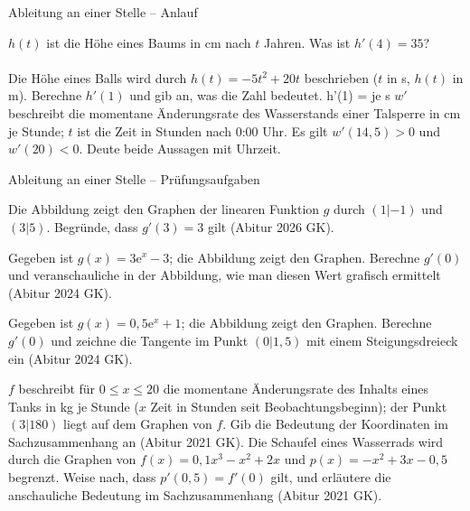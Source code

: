 \begin{aufgabe}{Ableitung an einer Stelle – Anlauf}
\begin{teile}
\teil $h(t)$ ist die Höhe eines Baums in cm nach $t$ Jahren. Was ist $h'(4) = 35$? \\  \\ 
\teil Die Höhe eines Balls wird durch $h(t) = -5t^2 + 20t$ beschrieben ($t$ in s, $h(t)$ in m). Berechne $h'(1)$ und gib an, was die Zahl bedeutet. h'(1) = \leerfeld[m] je s
\teil $w'$ beschreibt die momentane Änderungsrate des Wasserstands einer Talsperre in cm je Stunde; $t$ ist die Zeit in Stunden nach 0:00 Uhr. Es gilt $w'(14{,}5) > 0$ und $w'(20) < 0$. Deute beide Aussagen mit Uhrzeit.
\end{teile}
\end{aufgabe}

\begin{aufgabe}{Ableitung an einer Stelle – Prüfungsaufgaben}
\begin{teile}
\teil Die Abbildung zeigt den Graphen der linearen Funktion $g$ durch $(1 | -1)$ und $(3 | 5)$. Begründe, dass $g'(3) = 3$ gilt \hfill (Abitur 2026 GK).

\begin{ksys}[xmin=-1,xmax=4,ymin=-3,ymax=7,ablesen]\end{ksys}
\teil Gegeben ist $g(x) = 3\mathrm{e}^x - 3$; die Abbildung zeigt den Graphen. Berechne $g'(0)$ und veranschauliche in der Abbildung, wie man diesen Wert grafisch ermittelt \hfill (Abitur 2024 GK).

\begin{ksys}[xmin=-3,xmax=2,ymin=-4,ymax=8,ablesen]\end{ksys}
\teil Gegeben ist $g(x) = 0{,}5\mathrm{e}^x + 1$; die Abbildung zeigt den Graphen. Berechne $g'(0)$ und zeichne die Tangente im Punkt $(0 | 1{,}5)$ mit einem Steigungsdreieck ein \hfill (Abitur 2024 GK).

\begin{ksys}[xmin=-3,xmax=2,ymin=-1,ymax=5,ablesen]\end{ksys}
\teil $f$ beschreibt für $0 \le x \le 20$ die momentane Änderungsrate des Inhalts eines Tanks in kg je Stunde ($x$ Zeit in Stunden seit Beobachtungsbeginn); der Punkt $(3 | 180)$ liegt auf dem Graphen von $f$. Gib die Bedeutung der Koordinaten im Sachzusammenhang an \hfill (Abitur 2021 GK).
\teil Die Schaufel eines Wasserrads wird durch die Graphen von $f(x) = 0{,}1x^3 - x^2 + 2x$ und $p(x) = -x^2 + 3x - 0{,}5$ begrenzt. Weise nach, dass $p'(0{,}5) = f'(0)$ gilt, und erläutere die anschauliche Bedeutung im Sachzusammenhang \hfill (Abitur 2021 GK).
\end{teile}
\end{aufgabe}

